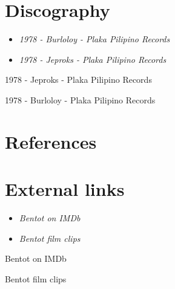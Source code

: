 \section{Discography}\label{discography}

\begin{itemize}
\item
  \emph{1978 - Burloloy - Plaka Pilipino Records}
\item
  \emph{1978 - Jeproks - Plaka Pilipino Records}
\end{itemize}

1978 - Jeproks - Plaka Pilipino Records

1978 - Burloloy - Plaka Pilipino Records

\section{References}\label{references}

\section{External links}\label{external-links}

\begin{itemize}
\item
  \emph{Bentot on IMDb}
\item
  \emph{Bentot film clips}
\end{itemize}

Bentot on IMDb

Bentot film clips
